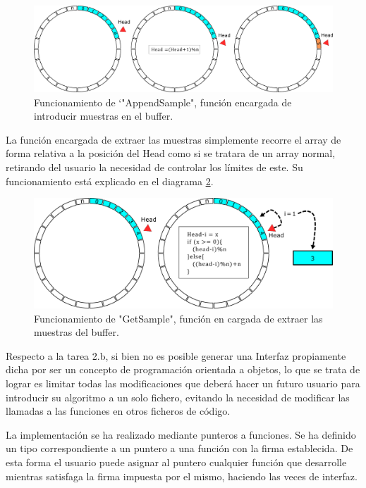         \begin{figure}[H] 
                \centering
                        \includegraphics[width = \linewidth]{figuras/bufferAppend.png}
                \caption{Funcionamiento de \char`"AppendSample", función encargada de introducir muestras en el buffer.}
                \label{fig:bufferDiagramAppend}
        \end{figure}
        
        La función encargada de extraer las muestras simplemente recorre el array de forma relativa a la posición del Head como si se tratara de un array normal, retirando del usuario la necesidad de controlar los límites de este. Su funcionamiento está explicado en el diagrama \ref{fig:bufferDiagramGet}.
        
        \begin{figure}[H]
                \centering
                        \includegraphics[width = 0.9 \linewidth]{figuras/bufferGet.png}
                \caption{Funcionamiento de "GetSample", función en cargada de extraer las muestras del buffer.}
                \label{fig:bufferDiagramGet}
        \end{figure}
        
        Respecto a la tarea 2.b, si bien no es posible generar una Interfaz propiamente dicha por ser un concepto de programación orientada a objetos, lo que se trata de lograr es limitar todas las modificaciones que deberá hacer un futuro usuario para introducir su algoritmo a un solo fichero, evitando la necesidad de modificar las llamadas a las funciones en otros ficheros de código. 

        La implementación se ha realizado mediante punteros a funciones. Se ha definido un tipo correspondiente a un puntero a una función con la firma establecida. De esta forma el usuario puede asignar al puntero cualquier función que desarrolle mientras satisfaga la firma impuesta por el mismo, haciendo las veces de interfaz.
        
